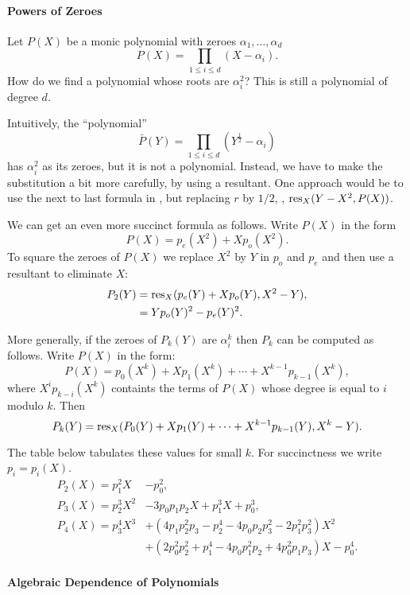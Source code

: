 \paragraph{Powers of Zeroes}

Let $P(X)$ be a monic polynomial with zeroes $\alpha_1, \ldots, \alpha_d$
\[
P(X) =  \prod_{1 \le i \le d}(X - \alpha_i).
\]
How do we find a polynomial whose roots are $\alpha_i^2$?  This is
still a polynomial of degree $d$.  

Intuitively, the ``polynomial''
\[
\bar{P}(Y) =  \prod_{1 \le i \le d}\left(Y^{\frac{1}{2}} - \alpha_i\right)
\]
has $\alpha_i^2$ as its zeroes, but it is not a polynomial.  Instead,
we have to make the substitution a bit more carefully, by using a
resultant.  One approach would be to use the next to last formula in
, but replacing $r$ by $1/2$, \eg, 
$\mathop{\rm res}\nolimits_X(Y - X^2, P(X))$.

We can get an even more succinct formula as follows.  Write $P(X)$ in
the form
\[
P(X) = p_e(X^2) + X p_o(X^2).
\]
To square the zeroes of $P(X)$ we replace $X^2$ by $Y$ in $p_o$ and
$p_e$ and then use a resultant to eliminate $X$:
\[
\begin{aligned}
P_2(Y) & = \mathop{\rm res}\nolimits_X (p_e(Y) + X p_o(Y), X^2 - Y), \\
    & = Y p_o(Y)^2 - p_e(Y)^2.
\end{aligned}
\]

More generally, if the zeroes of $P_k(Y)$ are $\alpha_i^k$ then $P_k$
can be computed as follows.  Write $P(X)$ in the form:
\[
P(X) = p_0(X^k) + X p_1(X^k) + \cdots + X^{k-1} p_{k-1}(X^k),
\]
where $X^ip_{k-i}(X^k)$ containts the terms of $P(X)$ whose degree is equal to $i$ modulo $k$.  Then 
\[
P_k(Y) = \mathop{\rm res}\nolimits_X(P_0(Y) + Xp_1(Y) + \cdots + X^{k-1}p_{k-1}(Y), X^k -
Y).
\]

The table below tabulates these values for small $k$.  For succinctness
we write $p_i = p_i(X)$.
\[
\begin{aligned}
P_2(X) = p_1^2 X&- p_0^2, \\
P_3(X) = p_2^3 X^2 &- 3 p_0 p_1 p_2 X + p_1^3 X + p_0^3, \\
P_4(X) = p_3^4 X^3 &+ (4 p_1 p_2^2 p_3 - p_2^4 - 4p_0 p_2 p_3^2 -
2p_1^2 p_3^2) X^2 \\
  & + (2 p_0^2 p_2^2 + p_1^4 - 4 p_0 p_1^2 p_2 + 4 p_0^2
p_1 p_3) X - p_0^4.
\end{aligned}
\]

\paragraph{Algebraic Dependence of Polynomials}

